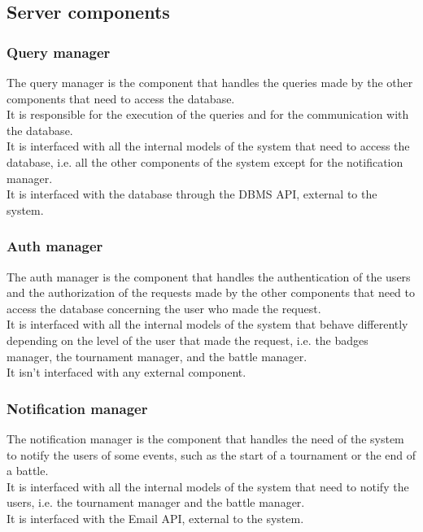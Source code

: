 \subsection{Server components}

\subsubsection*{Query manager}
The query manager is the component that handles the queries made by the other components that need to access the database. \\
It is responsible for the execution of the queries and for the communication with the database. \\
It is interfaced with all the internal models of the system that need to access the database, i.e. all the other components of the system except for the notification manager. \\
It is interfaced with the database through the DBMS API, external to the system.

\subsubsection*{Auth manager}
The auth manager is the component that handles the authentication of the users and the authorization of the requests made by the other components that need to access the database concerning the user who made the request.\\
It is interfaced with all the internal models of the system that behave differently depending on the level of the user that made the request, i.e. the badges manager, the tournament manager, and the battle manager.\\
It isn't interfaced with any external component.

\subsubsection*{Notification manager}
The notification manager is the component that handles the need of the system to notify the users of some events, such as the start of a tournament or the end of a battle. \\
It is interfaced with all the internal models of the system that need to notify the users, i.e. the tournament manager and the battle manager. \\
It is interfaced with the Email API, external to the system.

\newpage


